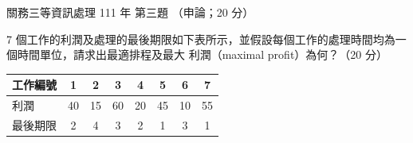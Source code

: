 \begin{pastexam}[label={px:gw3-111-ds-03}]{關務三等資訊處理 111 年 第三題}
（申論；20 分）

7 個工作的利潤及處理的最後期限如下表所示，並假設每個工作的處理時間均為一個時間單位，請求出最適排程及最大
利潤（maximal profit）為何？（20 分）
\begin{center}
\begin{tabular}{|l|*{7}{c|}}
\hline
工作編號 & 1 & 2 & 3 & 4 & 5 & 6 & 7 \\ \hline
利潤 & 40 & 15 & 60 & 20 & 45 & 10 & 55 \\ \hline
最後期限 & 2 & 4 & 3 & 2 & 1 & 3 & 1 \\ \hline
\end{tabular}
\end{center}
\end{pastexam}

